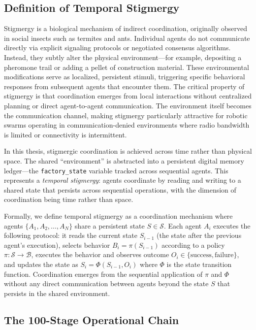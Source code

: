 \documentclass[12pt,a4paper,oneside]{report}
\begin{document}
\subsection{Definition of Temporal Stigmergy}
\label{subsec:definition_of_temporal_stigmergy}

Stigmergy is a biological mechanism of indirect coordination, originally observed in social insects such as termites and ants. Individual agents do not communicate directly via explicit signaling protocols or negotiated consensus algorithms. Instead, they subtly alter the physical environment—for example, depositing a pheromone trail or adding a pellet of construction material. These environmental modifications serve as localized, persistent stimuli, triggering specific behavioral responses from subsequent agents that encounter them. The critical property of stigmergy is that coordination emerges from local interactions without centralized planning or direct agent-to-agent communication. The environment itself becomes the communication channel, making stigmergy particularly attractive for robotic swarms operating in communication-denied environments where radio bandwidth is limited or connectivity is intermittent.

In this thesis, stigmergic coordination is achieved across time rather than physical space. The shared ``environment'' is abstracted into a persistent digital memory ledger—the \texttt{factory\_state} variable tracked across sequential agents. This represents a \textit{temporal stigmergy}: agents coordinate by reading and writing to a shared state that persists across sequential operations, with the dimension of coordination being time rather than space.

Formally, we define temporal stigmergy as a coordination mechanism where agents $\{A_1, A_2, \ldots, A_N\}$ share a persistent state $S \in \mathcal{S}$. Each agent $A_i$ executes the following protocol: it reads the current state $S_{i-1}$ (the state after the previous agent's execution), selects behavior $B_i = \pi(S_{i-1})$ according to a policy $\pi: \mathcal{S} \rightarrow \mathcal{B}$, executes the behavior and observes outcome $O_i \in \{\text{success}, \text{failure}\}$, and updates the state as $S_i = \Phi(S_{i-1}, O_i)$ where $\Phi$ is the state transition function. Coordination emerges from the sequential application of $\pi$ and $\Phi$ without any direct communication between agents beyond the state $S$ that persists in the shared environment.

\subsection{The 100-Stage Operational Chain}
\label{subsec:the_100_stage_operational_chain}
\end{document}
